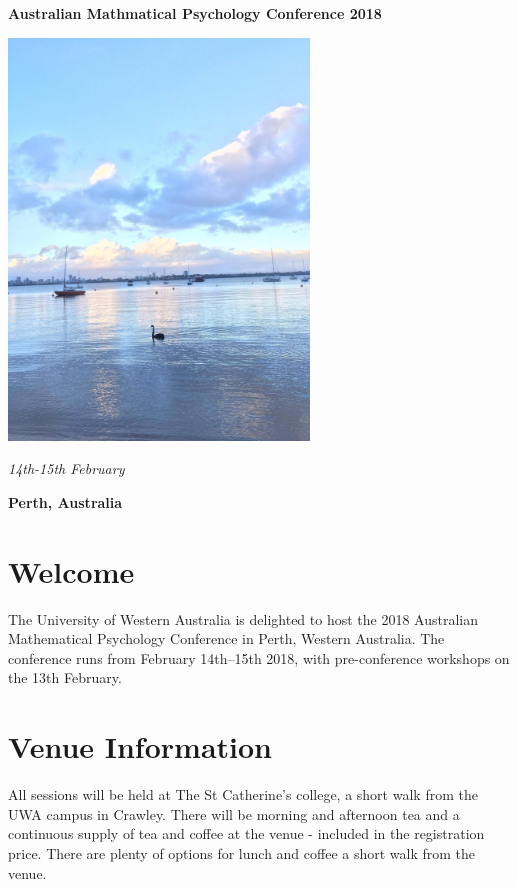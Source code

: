 \documentclass[]{article}
\title{}
\author{}
\date{}
\begin{document}
\begin{center}
\Huge
{\bf Australian Mathmatical Psychology Conference 2018}    
\vspace{3 cm}
\end{center}

\begin{center}
\includegraphics[width=8cm]{images/River}
\vspace{0.5 cm}
\end{center}

\begin{center}
\Large {\it 14th-15th February}

{\bf Perth, Australia}
\end{center}

\newpage

\section{Welcome}\label{welcome}

The University of Western Australia is delighted to host the 2018
Australian Mathematical Psychology Conference in Perth, Western
Australia. The conference runs from February 14th--15th 2018, with
pre-conference workshops on the 13th February.

\section{Venue Information}\label{venue-information}

All sessions will be held at The St Catherine's college, a short walk
from the UWA campus in Crawley. There will be morning and afternoon tea
and a continuous supply of tea and coffee at the venue - included in the
registration price. There are plenty of options for lunch and coffee a
short walk from the venue.
\end{document}
